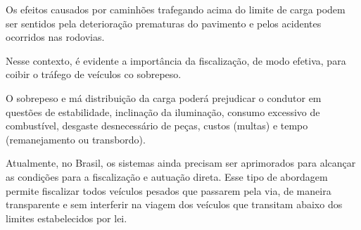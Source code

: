 \documentclass{ufscThesis}
\begin{document}
Os efeitos causados por caminhões trafegando acima do limite de carga podem ser sentidos pela deterioração prematuras do pavimento e pelos acidentes ocorridos nas rodovias.

Nesse contexto, é evidente a importância da fiscalização, de modo efetiva, para coibir o tráfego de veículos co sobrepeso.

O sobrepeso e má distribuição da carga poderá prejudicar o condutor em questões de estabilidade, inclinação da iluminação, consumo excessivo de combustível, desgaste desnecessário de peças, custos (multas) e tempo (remanejamento ou transbordo).

Atualmente, no Brasil, os sistemas ainda precisam ser aprimorados para alcançar as condições para a fiscalização e autuação direta. Esse tipo de abordagem permite fiscalizar todos veículos pesados que passarem pela via, de maneira transparente e sem interferir na viagem dos veículos que transitam abaixo dos limites estabelecidos por lei.









\end{document}
